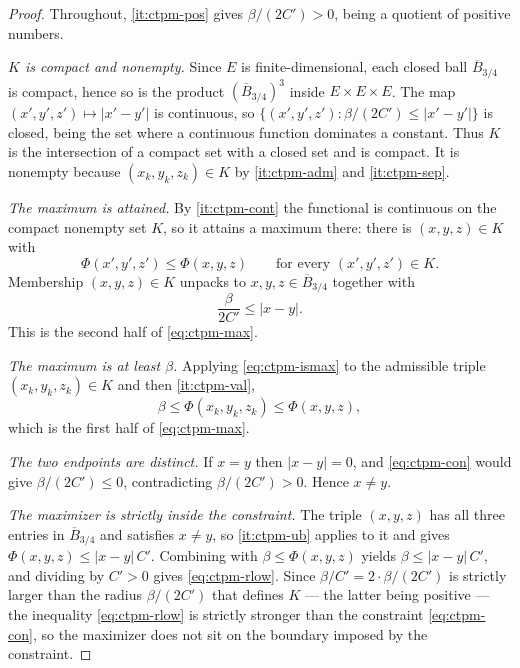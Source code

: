 \begin{proof}
Throughout, \ref{it:ctpm-pos} gives $\beta/(2C')>0$, being a quotient of
positive numbers.

\emph{$K$ is compact and nonempty.} Since $E$ is finite-dimensional, each closed
ball $\overline B_{3/4}$ is compact, hence so is the product
$(\overline B_{3/4})^3$ inside $E\times E\times E$. The map
$(x',y',z')\mapsto|x'-y'|$ is continuous, so
$\{(x',y',z'):\beta/(2C')\le|x'-y'|\}$ is closed, being the set where a
continuous function dominates a constant. Thus $K$ is the intersection of a
compact set with a closed set and is compact. It is nonempty because
$(x_k,y_k,z_k)\in K$ by \ref{it:ctpm-adm} and \ref{it:ctpm-sep}.

\emph{The maximum is attained.} By \ref{it:ctpm-cont} the functional is
continuous on the compact nonempty set $K$, so it attains a maximum there: there
is $(x,y,z)\in K$ with
\begin{equation}\label{eq:ctpm-ismax}
  \Phi(x',y',z')\le\Phi(x,y,z)\qquad\text{for every }(x',y',z')\in K .
\end{equation}
Membership $(x,y,z)\in K$ unpacks to $x,y,z\in\overline B_{3/4}$ together with
\begin{equation}\label{eq:ctpm-con}
  \frac{\beta}{2C'}\le|x-y| .
\end{equation}
This is the second half of \eqref{eq:ctpm-max}.

\emph{The maximum is at least $\beta$.} Applying \eqref{eq:ctpm-ismax} to the
admissible triple $(x_k,y_k,z_k)\in K$ and then \ref{it:ctpm-val},
\[
  \beta\le\Phi(x_k,y_k,z_k)\le\Phi(x,y,z),
\]
which is the first half of \eqref{eq:ctpm-max}.

\emph{The two endpoints are distinct.} If $x=y$ then $|x-y|=0$, and
\eqref{eq:ctpm-con} would give $\beta/(2C')\le0$, contradicting
$\beta/(2C')>0$. Hence $x\ne y$.

\emph{The maximizer is strictly inside the constraint.} The triple $(x,y,z)$
has all three entries in $\overline B_{3/4}$ and satisfies $x\ne y$, so
\ref{it:ctpm-ub} applies to it and gives $\Phi(x,y,z)\le|x-y|\,C'$. Combining
with $\beta\le\Phi(x,y,z)$ yields $\beta\le|x-y|\,C'$, and dividing by $C'>0$
gives \eqref{eq:ctpm-rlow}. Since $\beta/C'=2\cdot\beta/(2C')$ is strictly
larger than the radius $\beta/(2C')$ that defines $K$ --- the latter being
positive --- the inequality \eqref{eq:ctpm-rlow} is strictly stronger than the
constraint \eqref{eq:ctpm-con}, so the maximizer does not sit on the boundary
imposed by the constraint.
\end{proof}
